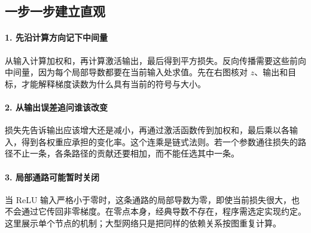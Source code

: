 \subsection*{一步一步建立直观}

\paragraph{1. 先沿计算方向记下中间量}

从输入计算加权和，再计算激活输出，最后得到平方损失。反向传播需要这些前向中间量，因为每个局部导数都要在当前输入处求值。先在右图核对 $z$、输出和目标，才能解释梯度读数为什么具有当前的符号与大小。



\paragraph{2. 从输出误差追问谁该改变}

损失先告诉输出应该增大还是减小，再通过激活函数传到加权和，最后乘以各输入，得到各权重应承担的变化率。这个连乘是链式法则。若一个参数通往损失的路径不止一条，各条路径的贡献还要相加，而不能任选其中一条。



\paragraph{3. 局部通路可能暂时关闭}

当 ReLU 输入严格小于零时，这条通路的局部导数为零，即使当前损失很大，也不会通过它传回非零梯度。在零点本身，经典导数不存在，程序需选定实现约定。这里展示单个节点的机制；大型网络只是把同样的依赖关系按图重复计算。

